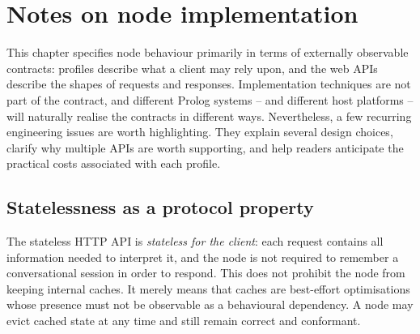 %

\section{Notes on node implementation}\label{sec:node-implementation-notes}

This chapter specifies node behaviour primarily in terms of externally observable contracts: profiles describe what a client may rely upon, and the web APIs describe the shapes of requests and responses. Implementation techniques are not part of the contract, and different Prolog systems -- and different host platforms -- will naturally realise the contracts in different ways. Nevertheless, a few recurring engineering issues are worth highlighting. They explain several design choices, clarify why multiple APIs are worth supporting, and help readers anticipate the practical costs associated with each profile.

\subsection{Statelessness as a protocol property}\label{sec:statelessness-protocol}

The stateless HTTP API is \emph{stateless for the client}: each request contains all information needed to interpret it, and the node is not required to remember a conversational session in order to respond. This does not prohibit the node from keeping internal caches. It merely means that caches are best-effort optimisations whose presence must not be observable as a behavioural dependency. A node may evict cached state at any time and still remain correct and conformant.

